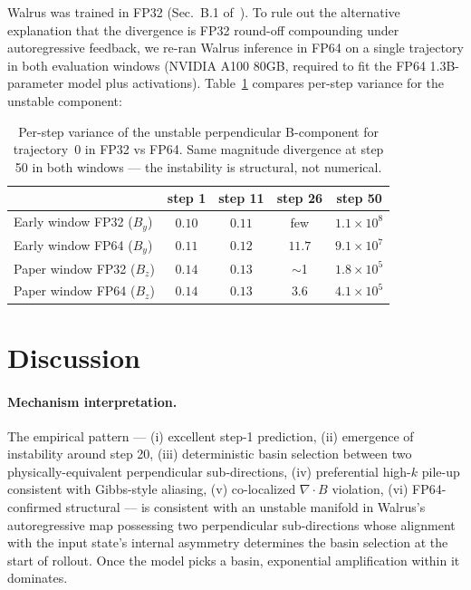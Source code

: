 \documentclass{article}
\begin{document}
Walrus was trained in FP32 (Sec.~B.1 of~\cite{mccabe2025walrus}). To rule out the alternative explanation that the divergence is FP32 round-off compounding under autoregressive feedback, we re-ran Walrus inference in FP64 on a single trajectory in both evaluation windows (NVIDIA A100 80GB, required to fit the FP64 1.3B-parameter model plus activations). Table~\ref{tab:fp64} compares per-step variance for the unstable component:

\begin{table}[t]
  \centering
  \small
  \caption{Per-step variance of the unstable perpendicular B-component for trajectory~0 in FP32 vs FP64. Same magnitude divergence at step 50 in both windows --- the instability is structural, not numerical.}
  \label{tab:fp64}
  \begin{tabular}{l|cccc}
    \toprule
    & step 1 & step 11 & step 26 & step 50 \\
    \midrule
    Early window FP32 ($B_y$)  & $0.10$ & $0.11$ & few    & $1.1 \times 10^{8}$ \\
    Early window FP64 ($B_y$)  & $0.11$ & $0.12$ & $11.7$ & $9.1 \times 10^{7}$ \\
    Paper window FP32 ($B_z$)  & $0.14$ & $0.13$ & $\sim$1 & $1.8 \times 10^{5}$ \\
    Paper window FP64 ($B_z$)  & $0.14$ & $0.13$ & $3.6$  & $4.1 \times 10^{5}$ \\
    \bottomrule
  \end{tabular}
\end{table}

\section{Discussion}

\paragraph{Mechanism interpretation.} The empirical pattern --- (i) excellent step-1 prediction, (ii) emergence of instability around step 20, (iii) deterministic basin selection between two physically-equivalent perpendicular sub-directions, (iv) preferential high-$k$ pile-up consistent with Gibbs-style aliasing, (v) co-localized $\nabla\cdot B$ violation, (vi) FP64-confirmed structural --- is consistent with an unstable manifold in Walrus's autoregressive map possessing two perpendicular sub-directions whose alignment with the input state's internal asymmetry determines the basin selection at the start of rollout. Once the model picks a basin, exponential amplification within it dominates.
\end{document}
